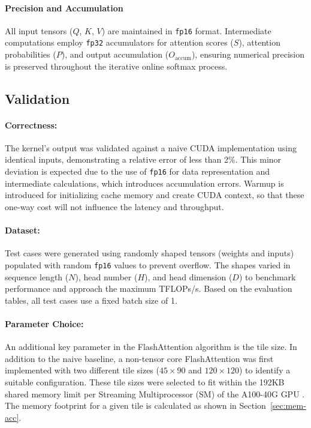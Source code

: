 \documentclass[11pt]{article}
\renewcommand\cite{\citep}  %
\begin{document}
\paragraph{Precision and Accumulation}
All input tensors ($Q$, $K$, $V$) are maintained in \texttt{fp16} format. Intermediate computations employ \texttt{fp32} accumulators for attention scores ($S$), attention probabilities ($P$), and output accumulation ($O_{\text{accum}}$), ensuring numerical precision is preserved throughout the iterative online softmax process.

\subsection{Validation}

\paragraph{Correctness:} The kernel's output was validated against a naive CUDA implementation using identical inputs, demonstrating a relative error of less than 2\%. This minor deviation is expected due to the use of \texttt{fp16} for data representation and intermediate calculations, which introduces accumulation errors. Warmup is introduced for initializing cache memory and create CUDA context, so that these one-way cost will not influence the latency and throughput.

\paragraph{Dataset:} Test cases were generated using randomly shaped tensors (weights and inputs) populated with random \texttt{fp16} values to prevent overflow. The shapes varied in sequence length ($N$), head number ($H$), and head dimension ($D$) to benchmark performance and approach the maximum TFLOPs/s. Based on the evaluation tables, all test cases use a fixed batch size of 1.

\paragraph{Parameter Choice:} An additional key parameter in the FlashAttention algorithm is the tile size. In addition to the naive baseline, a non-tensor core FlashAttention was first implemented with two different tile sizes ($45 \times 90$ and $120 \times 120$) to identify a suitable configuration. These tile sizes were selected to fit within the 192KB shared memory limit per Streaming Multiprocessor (SM) of the A100-40G GPU \cite{nvidia2022a100}. The memory footprint for a given tile is calculated as shown in Section~\ref{sec:mem-acc}.
\end{document}
